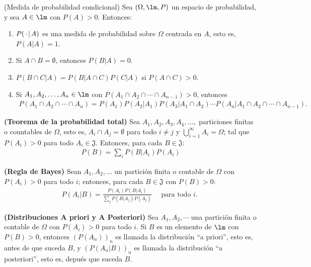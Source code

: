 \begin{theorem}(Medida de probabilidad condicional)
    Sea $(\Omega, \lm, P)$ un espacio de probabilidad, y sea $A\in \lm$ con $P(A)> 0$. Entonces:
    \begin{enumerate}[{\rm 1.}]
        \item $P( \hspace{0.5mm}\cdot\hspace{0.5mm} |\hspace{0.5mm}A)$ es una medida de probabilidad sobre $\Omega$ centrada en $A$, esto es, $P(A|A)=1$.
        \item Si $A\cap B = \emptyset$, entonces $P(B|A)=0$.
        \item $P(B\cap C| A)=P(B|A\cap C)P(C|A)$ si $P(A\cap C)> 0.$
        \item Si $A_1, A_2,\ldots, A_n \in \lm$ con $P(A_1 \cap A_2 \cap \cdots \cap A_{n-1})> 0$, entonces 
        \begin{align*}
            P(A_1 \cap A_2 \cap \cdots \cap A_{n}) = P(A_1)P(A_2|A_1)P(A_3|A_1\cap A_2)\cdots P(A_n|A_1\cap A_2\cap \cdots \cap A_{n-1}).
        \end{align*}
    \end{enumerate}
\end{theorem}

\begin{theorem}{\bf (Teorema de la probabilidad total)}
    Sea $A_1, A_2, A_3, A_4, \ldots,$ particiones finitas o countables de $\Omega$, esto es, $A_i\cap A_j=\emptyset$ para todo  $i \not= j$
    y  $\bigcup_{i=1}^{\infty} A_i = \Omega$; tal que $P(A_i)> 0 $ para todo $A_i \in \mathfrak{J}$. Entonces, para cada $B\in \mathfrak{J}$:
    \begin{align}
        P(B) = \sum_{i} P(B|A_i)P(A_i)
    \end{align}
\end{theorem} 

\begin{corollary}{\bf (Regla de Bayes)}
    Sean $A_1,A_2, \ldots$ un partici\'on finita o contable de $\Omega$ con $P(A_i)>0$ para todo $i$; entonces, para cada $B\in \mathfrak{J}$ con $P(B)>0$:
    \begin{align}
        P(A_i | B) = \frac{P(A_i)P(B|A_i)}{\sum_j P(B|A_j)P(A_j)} \quad\text{ para todo $i$. }
    \end{align}
\end{corollary}


\begin{definition}{\bf (Distribuciones A priori y A Posteriori)}\newline
    Sea $A_1, A_2, \cdots$ una partici\'on finita o contable de $\Omega$ con $P(A_i)>0$ para todo $i$. Si $B$ 
    es un elemento de $\lm$ con $P(B)>0$, entonces $(P(A_n))_{n}$ es llamada la distribuci\'on ``a priori'', esto es, antes de que suceda $B$, 
    y $(P(A_n|B))_{n}$ es llamada la distribuci\'on ``a posteriori'', esto es, depu\'es que suceda $B$.
\end{definition}

